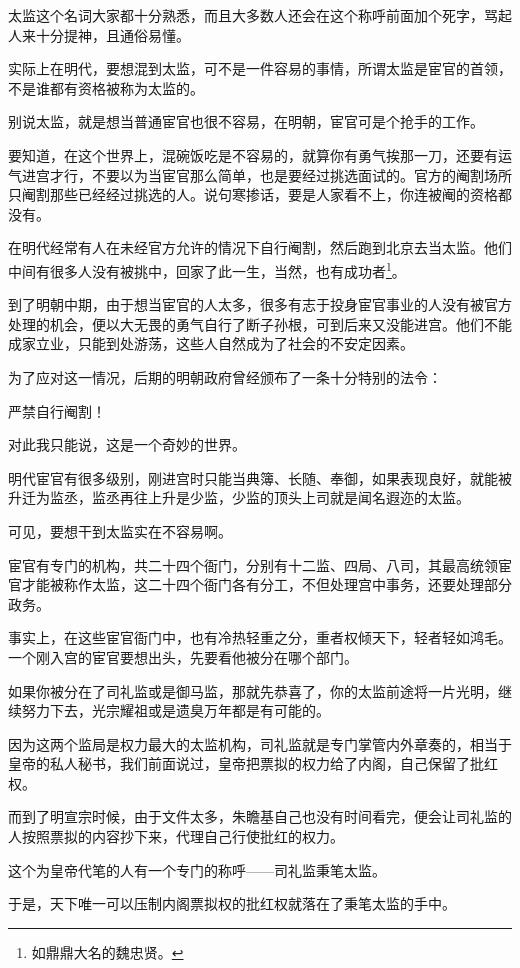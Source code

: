 \begin{multicols}{\theparacolNo}
太监这个名词大家都十分熟悉，而且大多数人还会在这个称呼前面加个死字，骂起人来十分提神，且通俗易懂。

实际上在明代，要想混到太监，可不是一件容易的事情，所谓太监是宦官的首领，不是谁都有资格被称为太监的。

别说太监，就是想当普通宦官也很不容易，在明朝，宦官可是个抢手的工作。

要知道，在这个世界上，混碗饭吃是不容易的，就算你有勇气挨那一刀，还要有运气进宫才行，不要以为当宦官那么简单，也是要经过挑选面试的。官方的阉割场所只阉割那些已经经过挑选的人。说句寒掺话，要是人家看不上，你连被阉的资格都没有。

在明代经常有人在未经官方允许的情况下自行阉割，然后跑到北京去当太监。他们中间有很多人没有被挑中，回家了此一生，当然，也有成功者\footnote{如鼎鼎大名的魏忠贤。}。

到了明朝中期，由于想当宦官的人太多，很多有志于投身宦官事业的人没有被官方处理的机会，便以大无畏的勇气自行了断子孙根，可到后来又没能进宫。他们不能成家立业，只能到处游荡，这些人自然成为了社会的不安定因素。

为了应对这一情况，后期的明朝政府曾经颁布了一条十分特别的法令：

严禁自行阉割！

对此我只能说，这是一个奇妙的世界。

明代宦官有很多级别，刚进宫时只能当典簿、长随、奉御，如果表现良好，就能被升迁为监丞，监丞再往上升是少监，少监的顶头上司就是闻名遐迩的太监。

可见，要想干到太监实在不容易啊。

宦官有专门的机构，共二十四个衙门，分别有十二监、四局、八司，其最高统领宦官才能被称作太监，这二十四个衙门各有分工，不但处理宫中事务，还要处理部分政务。

事实上，在这些宦官衙门中，也有冷热轻重之分，重者权倾天下，轻者轻如鸿毛。一个刚入宫的宦官要想出头，先要看他被分在哪个部门。

如果你被分在了司礼监或是御马监，那就先恭喜了，你的太监前途将一片光明，继续努力下去，光宗耀祖或是遗臭万年都是有可能的。

因为这两个监局是权力最大的太监机构，司礼监就是专门掌管内外章奏的，相当于皇帝的私人秘书，我们前面说过，皇帝把票拟的权力给了内阁，自己保留了批红权。

而到了明宣宗时候，由于文件太多，朱瞻基自己也没有时间看完，便会让司礼监的人按照票拟的内容抄下来，代理自己行使批红的权力。

这个为皇帝代笔的人有一个专门的称呼——司礼监秉笔太监。

于是，天下唯一可以压制内阁票拟权的批红权就落在了秉笔太监的手中。


\end{multicols}

